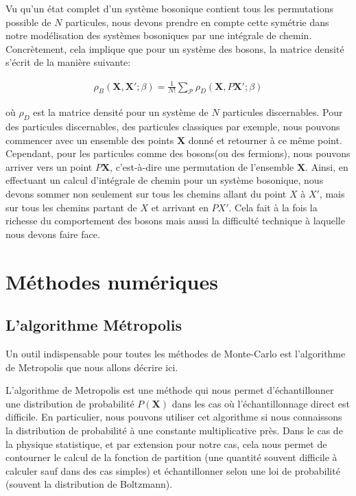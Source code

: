\documentclass[11pt]{article}
\theoremstyle{definition}
\theoremstyle{remark}
\begin{document}
Vu qu'un état complet d'un système bosonique contient tous les permutations possible de $N$ particules, nous devons prendre en compte cette symétrie dans notre modélisation des systèmes bosoniques par une intégrale de chemin. Concrètement, cela implique que pour un système des bosons, la matrice densité s'écrit de la manière suivante: 

\begin{align} 
\label{densite_boson}
\rho_{B}( \mathbf{X}, \mathbf{X}'; \beta) = \frac{1}{N!}\sum_{\mathcal{P}} \rho_{D} (\mathbf{X}, P \mathbf{X}'; \beta)
\end{align}

où $\rho_{D}$ est la matrice densité pour un système de $N$ particules discernables. Pour des particules discernables, des particules classiques par exemple, nous pouvons commencer avec un ensemble des points $\mathbf{X}$ donné et retourner à ce même point. Cependant, pour les particules comme des bosons(ou des fermions), nous pouvons arriver vers un point $P\mathbf{X}$, c'est-à-dire une permutation de l'ensemble $\mathbf{X}$. Ainsi, en effectuant un calcul d’intégrale de chemin pour un système bosonique, nous devons sommer non seulement sur tous les chemins allant du point $X$ à $X'$, mais sur tous les chemins partant de $X$ et arrivant en $PX'$. Cela fait à la fois la richesse du comportement des bosons mais aussi la difficulté technique à laquelle nous devons faire face. 

\section{Méthodes numériques}
\subsection{L'algorithme Métropolis}

Un outil indispensable pour toutes les méthodes de Monte-Carlo est l'algorithme de Metropolis que nous allons décrire ici. 

L'algorithme de Metropolis est une méthode qui nous permet d'échantillonner une distribution de probabilité $P(\mathbf{X})$ dans les cas où l’échantillonnage direct est difficile. En particulier, nous pouvons utiliser cet algorithme si nous connaissons la distribution de probabilité à une constante multiplicative près. Dans le cas de la physique statistique, et par extension pour notre cas, cela nous permet de contourner le calcul de la fonction de partition (une quantité souvent difficile à calculer sauf dans des cas simples) et échantillonner selon une loi de probabilité (souvent la distribution de Boltzmann).
\end{document}
